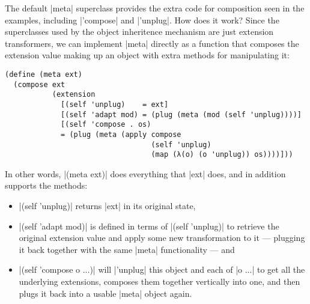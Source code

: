 The default \scm|meta| superclass provides the extra code for composition seen in the examples, including \scm|'compose| and \scm|'unplug|.
How does it work?
Since the superclasses used by the object inheritence mechanism are just extension transformers, we can implement \scm|meta| directly as a function that composes the extension value making up an object with extra methods for manipulating it:
\begin{verbatim}
(define (meta ext)
  (compose ext
           (extension
             [(self 'unplug)    = ext]
             [(self 'adapt mod) = (plug (meta (mod (self 'unplug))))]
             [(self 'compose . os)
             = (plug (meta (apply compose
                                  (self 'unplug)
                                  (map (λ(o) (o 'unplug)) os))))]))
\end{verbatim}
In other words, \scm|(meta ext)| does everything that \scm|ext| does, and in addition supports the methods:
\begin{itemize}
\item \scm|(self 'unplug)| returns \scm|ext| in its original state,
\item \scm|(self 'adapt mod)| is defined in terms of \scm|(self 'unplug)| to retrieve the original extension value and apply some new transformation to it --- plugging it back together with the same \scm|meta| functionality --- and
\item \scm|(self 'compose o ...)| will \scm|'unplug| this object and each of \scm|o ...| to get all the underlying extensions, composes them together vertically into one, and then plugs it back into a usable \scm|meta| object again.
\end{itemize}

